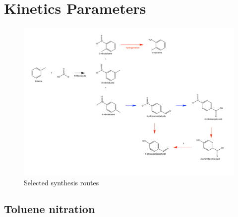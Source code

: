\section{Kinetics Parameters}
\label{app:kinetics}


% 

\begin{landscape}
\begin{figure}[H]
    \centering
    \includegraphics[width=0.8\linewidth]{figures/routes-chosen.pdf}
    \caption{Selected synthesis routes}
    \label{fig:routes-chosen}
\end{figure}
\end{landscape}


\subsection{Toluene nitration}
